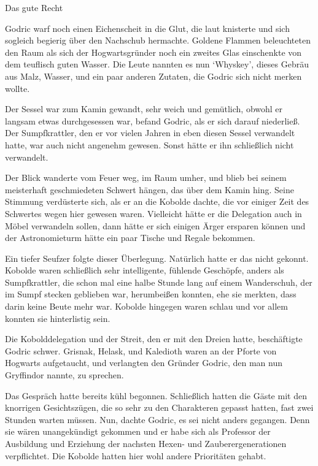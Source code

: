\documentclass[fontsize=12pt]{scrartcl}
\begin{document}
	{\huge  Das gute Recht}
	\vspace{15pt}
	
	{\LARGE G}odric warf noch einen Eichenscheit in die Glut, die laut knisterte und sich sogleich begierig über den Nachschub hermachte. Goldene Flammen beleuchteten den Raum als sich der Hogwartsgründer noch ein zweites Glas einschenkte von dem teuflisch guten Wasser. Die Leute nannten es nun \lq Whyskey\rq, dieses Gebräu aus Malz, Wasser, und ein paar anderen Zutaten, die Godric sich nicht merken wollte.
	
	Der Sessel war zum Kamin gewandt, sehr weich und gemütlich, obwohl er langsam etwas durchgesessen war, befand Godric, als er sich darauf niederließ. Der Sumpfkrattler, den er vor vielen Jahren in eben diesen Sessel verwandelt hatte, war auch nicht angenehm gewesen. Sonst hätte er ihn schließlich nicht verwandelt.
	
	Der Blick wanderte vom Feuer weg, im Raum umher, und blieb bei seinem meisterhaft geschmiedeten Schwert hängen, das über dem Kamin hing. Seine Stimmung verdüsterte sich, als er an die Kobolde dachte, die vor einiger Zeit des Schwertes wegen hier gewesen waren. Vielleicht hätte er die Delegation auch in Möbel verwandeln sollen, dann hätte er sich einigen Ärger ersparen können und der Astronomieturm hätte ein paar Tische und Regale bekommen.  
	
	Ein tiefer Seufzer folgte dieser Überlegung. Natürlich hatte er das nicht gekonnt. Kobolde waren schließlich sehr intelligente, fühlende Geschöpfe, anders als Sumpfkrattler, die schon mal eine halbe Stunde lang auf einem Wanderschuh, der im Sumpf stecken geblieben war, herumbeißen konnten, ehe sie merkten, dass darin keine Beute mehr war. Kobolde hingegen waren schlau und vor allem konnten sie hinterlistig sein. 
	
	Die Kobolddelegation und der Streit, den er mit den Dreien hatte, beschäftigte Godric schwer. Grisnak, Helask, und Kaledioth waren an der Pforte von Hogwarts aufgetaucht, und verlangten den Gründer Godric, den man  nun Gryffindor nannte, zu sprechen. 
	
	Das Gespräch hatte bereits kühl begonnen. Schließlich hatten die Gäste mit den knorrigen Gesichtszügen, die so sehr zu den Charakteren gepasst hatten, fast zwei Stunden warten müssen. Nun, dachte Godric, es sei nicht anders gegangen. Denn sie wären unangekündigt gekommen und er habe sich als Professor der Ausbildung und Erziehung der nachsten Hexen- und Zauberergenerationen verpflichtet. Die Kobolde hatten hier wohl andere Prioritäten gehabt.
	
\end{document}

